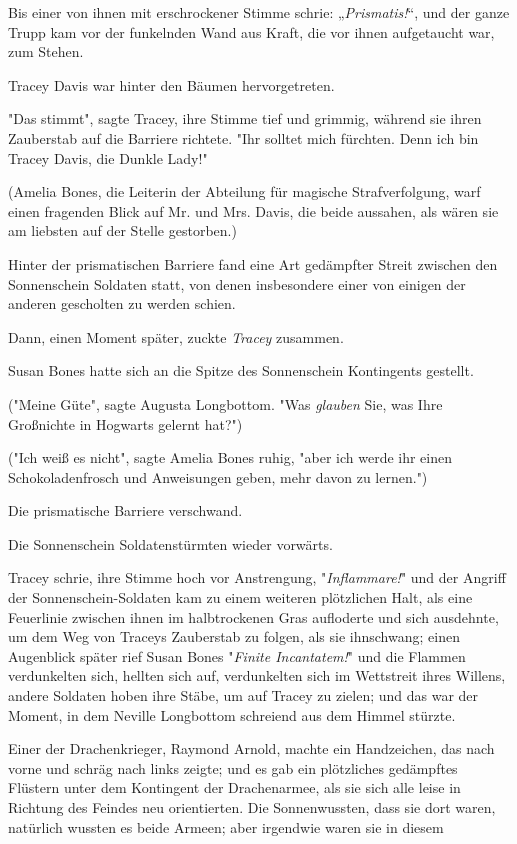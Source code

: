 {Bis einer von ihnen mit erschrockener Stimme schrie: „\emph{Prismatis!}“, und der ganze Trupp kam vor der funkelnden Wand aus Kraft, die vor ihnen aufgetaucht war, zum Stehen.

Tracey Davis war hinter den Bäumen hervorgetreten.

"Das stimmt", sagte Tracey, ihre Stimme tief und grimmig, während sie ihren Zauberstab auf die Barriere richtete. "Ihr solltet mich fürchten. Denn ich bin Tracey Davis, die Dunkle Lady!"

(Amelia Bones, die Leiterin der Abteilung für magische Strafverfolgung, warf einen fragenden Blick auf Mr. und Mrs. Davis, die beide aussahen, als wären sie am liebsten auf der Stelle gestorben.)

Hinter der prismatischen Barriere fand eine Art gedämpfter Streit zwischen den Sonnenschein Soldaten statt, von denen insbesondere einer von einigen der anderen gescholten zu werden schien.

Dann, einen Moment später, zuckte \emph{Tracey} zusammen.

Susan Bones hatte sich an die Spitze des Sonnenschein Kontingents gestellt.

("Meine Güte", sagte Augusta Longbottom. "Was \emph{glauben} Sie, was Ihre Großnichte in Hogwarts gelernt hat?")

("Ich weiß es nicht", sagte Amelia Bones ruhig, "aber ich werde ihr einen Schokoladenfrosch und Anweisungen geben, mehr davon zu lernen.")

Die prismatische Barriere verschwand.

Die Sonnenschein Soldatenstürmten wieder vorwärts.

Tracey schrie, ihre Stimme hoch vor Anstrengung, "\emph{Inflammare!}" und der Angriff der Sonnenschein-Soldaten kam zu einem weiteren plötzlichen Halt, als eine Feuerlinie zwischen ihnen im halbtrockenen Gras aufloderte und sich ausdehnte, um dem Weg von Traceys Zauberstab zu folgen, als sie ihnschwang; einen Augenblick später rief Susan Bones "\emph{Finite Incantatem!}" und die Flammen verdunkelten sich, hellten sich auf, verdunkelten sich im Wettstreit ihres Willens, andere Soldaten hoben ihre Stäbe, um auf Tracey zu zielen; und das war der Moment, in dem Neville Longbottom schreiend aus dem Himmel stürzte.

Einer der Drachenkrieger, Raymond Arnold, machte ein Handzeichen, das nach vorne und schräg nach links zeigte; und es gab ein plötzliches gedämpftes Flüstern unter dem Kontingent der Drachenarmee, als sie sich alle leise in Richtung des Feindes neu orientierten. Die Sonnenwussten, dass sie dort waren, natürlich wussten es beide Armeen; aber irgendwie waren sie in diesem

}

